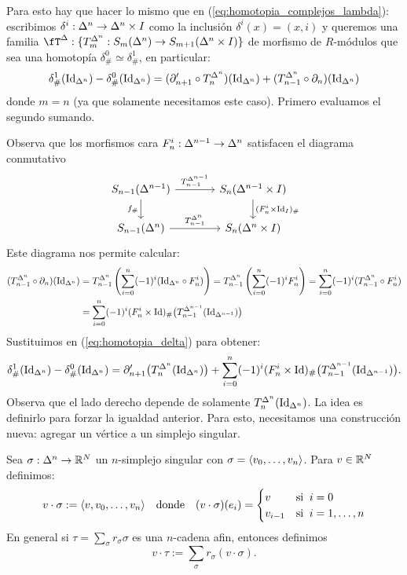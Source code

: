 \documentclass[../../topologia_algebraica]{subfiles}
\begin{document}
Para esto hay que hacer lo mismo que en (\ref{eq:homotopia_complejos_lambda}):
escribimos $\delta^i:\Delta^n\rightarrow\Delta^n\times I$ como la inclusi\'on
$\delta^i(x)=(x,i)$ y queremos una familia
$\fT^{\Delta}:\{T_m^{\Delta^n}:S_m(\Delta^n)\ra S_{m+1}(\Delta^n\times I)\}$ de
morfismo de $R$-m\'odulos que sea una homotop\'ia $\delta_{\#}^0\simeq\delta_{\#}^1$,
en particular:
\begin{equation}
  \label{eq:homotopia_delta}
  \delta_{\#}^1(\text{Id}_{\Delta^n})-\delta_{\#}^0(\text{Id}_{\Delta^n})=
  (\partial'_{n+1}\circ T_n^{\Delta^n})(\text{Id}_{\Delta^n})+
  (T_{n-1}^{\Delta^n}\circ\partial_n)(\text{Id}_{\Delta^n})
\end{equation}
donde $m=n$ (ya que solamente necesitamos este caso). Primero evaluamos el segundo sumando.

Observa que los morfismos cara $F_n^i:\Delta^{n-1}\rightarrow\Delta^n$ satisfacen el diagrama
conmutativo
\[
  \begin{tikzcd}[column sep=large]
    S_{n-1}(\Delta^{n-1}) \arrow[r,"T^{\Delta^{n-1}}_{n-1}"] \arrow[d,"f_{\#}"'] &
    S_{n}(\Delta^{n-1}\times I) \arrow[d,"(F_n^i\times\Id_I)_{\#}"]\\
    S_{n-1}(\Delta^n) \arrow[r,"T^{\Delta^n}_{n-1}"] & S_{n}(\Delta^n\times I)
  \end{tikzcd}
\]
Este diagrama nos permite calcular:
\begin{align*}
  (T_{n-1}^{\Delta^n}\circ\partial_n)(\text{Id}_{\Delta^n}) &=
  T_{n-1}^{\Delta^n}\left( \sum_{i=0}^n(-1)^i (\text{Id}_{\Delta^n}\circ F_n^i) \right) =
  T_{n-1}^{\Delta^n}\left( \sum_{i=0}^n(-1)^i F_n^i \right) =
  \sum_{i=0}^n(-1)^i(T_{n-1}^{\Delta^n}\circ F_n^i) \\ & =
  \sum_{i=0}^n(-1)^i (F_n^i\times\text{Id})_{\#}\big( T_{n-1}^{\Delta^{n-1}} (\text{Id}_{\Delta^{n-1}})\big)  
\end{align*}
Sustituimos en (\ref{eq:homotopia_delta}) para obtener:
\begin{equation}
  \label{eq:homotopia_delta_2}
  \delta_{\#}^1(\text{Id}_{\Delta^n})-\delta_{\#}^0(\text{Id}_{\Delta^n})=
  \partial'_{n+1}\big(T_n^{\Delta^n}(\text{Id}_{\Delta^n}) \big)+
  \sum_{i=0}^n(-1)^i (F_n^i\times\text{Id})_{\#}\big( T_{n-1}^{\Delta^{n-1}} (\text{Id}_{\Delta^{n-1}})\big).
\end{equation}
Observa que el lado derecho depende de solamente $T_n^{\Delta^n}(\text{Id}_{\Delta^n})$.
La idea es definirlo para forzar la igualdad anterior. Para esto, necesitamos una
construcci\'on nueva: agregar un v\'ertice a un simplejo singular.

\begin{defin}
  Sea $\sigma:\Delta^n\rightarrow\mathbb{R}^N$ un $n$-simplejo singular con $\sigma=\langle v_0,\ldots,v_n \rangle$.
  Para $v\in\mathbb{R}^N$ definimos:
  \[
    v\cdot\sigma:=\langle v,v_0,\ldots,v_n \rangle \quad\text{donde}\quad
    (v\cdot\sigma)(e_i)=
    \begin{cases}
      v &\text{si}\;\; i=0 \\
      v_{i-1} &\text{si}\;\; i=1,\ldots,n
    \end{cases}
  \]
  En general si $\tau=\sum_{\sigma}r_{\sigma}\sigma$ es una $n$-cadena afin, entonces
  definimos
  \[
    v\cdot\tau:=\sum_{\sigma}r_{\sigma}(v\cdot\sigma).
  \]  
\end{defin}
\end{document}
